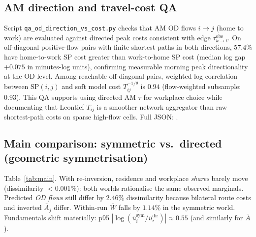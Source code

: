 \documentclass[12pt]{article}
\newcommand{\Wbar}{\bar W}
\newcommand{\ubar}{\bar u}
\newcommand{\Abar}{\bar A}
\newcommand{\obs}{\mathrm{obs}}
\newcommand{\sym}{\mathrm{sym}}
\newcommand{\dir}{\mathrm{dir}}
\begin{document}
\subsection{AM direction and travel-cost QA}\label{sec:qa_direction}

Script \texttt{qa\_od\_direction\_vs\_cost.py} checks that AM OD flows $i\to j$
(home to work) are evaluated against directed peak costs consistent with edge
$\tau^{\obs}_{k\to l}$.
On off-diagonal positive-flow pairs with finite shortest paths in both directions,
$57.4\%$ have home-to-work SP cost greater than work-to-home SP cost (median log gap
$+0.075$ in minutes-log units), confirming measurable morning peak directionality at the
OD level.
Among reachable off-diagonal pairs, weighted log correlation between SP$(i,j)$ and
soft model cost $T_{ij}^{-1/\theta}$ is $0.94$ (flow-weighted subsample: $0.93$).
This QA supports using directed AM $\tau$ for workplace choice while documenting that
Leontief $T_{ij}$ is a smoother network aggregator than raw shortest-path costs on
sparse high-flow cells.
Full JSON: .

\subsection{Main comparison: symmetric vs.\ directed (geometric symmetrisation)}

Table~\ref{tab:main}.
With re-inversion, residence and workplace \emph{shares} barely move (dissimilarity
$<0.001\%$): both worlds rationalise the same observed marginals.
Predicted \emph{OD flows} still differ by $2.46\%$ dissimilarity because bilateral
route costs and inverted $\Abar_j$ differ.
Within-run $\Wbar$ falls by $1.14\%$ in the symmetric world.
Fundamentals shift materially: p95 $|\log(\ubar_i^{\sym}/\ubar_i^{\dir})|\approx 0.55$
(and similarly for $\Abar$).
\end{document}
